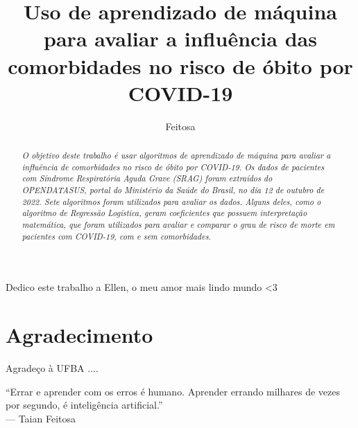 \documentclass[espec,ppgcdbd]{destufba}
\title{Uso de aprendizado de máquina para avaliar a influência das comorbidades no risco de óbito por COVID-19}
\author{Feitosa}{Taian Fonseca}
\begin{document}
%
%

    \maketitle

%
%

    \begin{dedicatoria}
        Dedico este trabalho a Ellen, o meu amor mais lindo mundo <3
    \end{dedicatoria}

%
%
%

    \chapter*{Agradecimento}
    Agradeço à UFBA ....

%
%
    \begin{epigrafe}
        ``Errar e aprender com os erros é humano. Aprender errando milhares de vezes por segundo, é inteligência artificial.''\\
        --- Taian Feitosa
    \end{epigrafe}

%
%

    \begin{abstract}
        \emph{
            O objetivo deste trabalho é usar algoritmos de aprendizado de máquina para avaliar a influência de comorbidades no risco de óbito por COVID-19. Os dados de pacientes com Síndrome Respiratória Aguda Grave (SRAG) foram extraídos do OPENDATASUS, portal do Ministério da Saúde do Brasil, no dia 12 de outubro de 2022. Sete algoritmos foram utilizados para avaliar os dados. Alguns deles, como o algoritmo de Regressão Logística, geram coeficientes que possuem interpretação matemática, que foram utilizados para avaliar e comparar o grau de risco de morte em pacientes com COVID-19, com e sem comorbidades.
        }
    \end{abstract}
\end{document}
